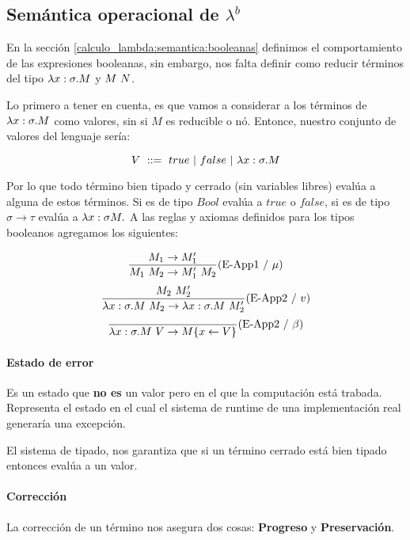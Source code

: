 \subsection{Semántica operacional de \texorpdfstring{$\lambda^b$}{lambda b}}
En la sección \ref{calculo_lambda:semantica:booleanas} definimos el comportamiento de las expresiones booleanas, sin embargo, nos falta definir como reducir términos del tipo $\lambda x: \sigma . M$ y $M~N$.

Lo primero a tener en cuenta, es que vamos a considerar a los términos de $\lambda x: \sigma . M$ como valores, sin si $M$ es reducible o nó. Entonce, nuestro conjunto de valores del lenguaje sería:

$$ V  ~::=~ true~|~false~|~\lambda x: \sigma . M$$

Por lo que todo término bien tipado y cerrado (sin variables libres) evalúa a alguna de estos términos. Si es de tipo $Bool$ evalúa a $true$ o $false$, si es de tipo $\sigma\to\tau$ evalúa a $\lambdaAbs{x}{\sigma{M}}$
A las reglas y axiomas definidos para los tipos booleanos agregamos los siguientes:

\begin{equation*}
\frac{M_1\to M'_1}{M_1~M_2 \to 
M'_1~M_2}(\text{E-App1}~ /~ \mu)
\end{equation*}
\vspace*{5mm}
\begin{equation*}
\frac{M_2~M'_2}{\lambda x: \sigma . M~M_2 \to 
	\lambda x: \sigma . M~M'_2}(\text{E-App2}~/~v)
\end{equation*}	
\vspace*{5mm}
\begin{equation*}
\frac{}{\lambda x: \sigma . M~V \to 
	M\{x\leftarrow V\}}(\text{E-App2}~/~\beta)
\end{equation*}

\paragraph{Estado de error} Es un estado que \textbf{no es} un valor pero en el que la computación está trabada. Representa el estado en el cual el sistema de runtime de una implementación real generaría una excepción.

El sistema de tipado, nos garantiza que si un término cerrado está bien tipado entonces evalúa a un valor.


 \paragraph{Corrección}
La corrección de un término nos asegura dos cosas:	\textbf{Progreso} y \textbf{Preservación}.

